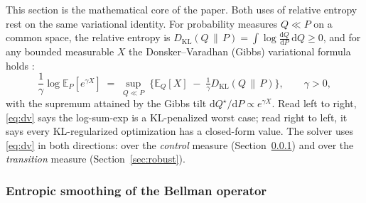 \documentclass[pdflatex,sn-mathphys-num]{sn-jnl}
\theoremstyle{thmstyleone}
\theoremstyle{thmstyletwo}
\theoremstyle{thmstylethree}
\newcommand{\dif}{\mathrm{d}}
\newcommand{\E}{\mathbb{E}}
\newcommand{\KL}[2]{D_{\mathrm{KL}}\!\left(#1 \,\middle\|\, #2\right)}
\begin{document}
This section is the mathematical core of the paper. Both uses of relative
entropy rest on the same variational identity. For probability measures
$Q \ll P$ on a common space, the relative entropy is
$\KL{Q}{P} = \int \log\frac{\dif Q}{\dif P}\,\dif Q \ge 0$, and for any
bounded measurable $X$ the Donsker--Varadhan (Gibbs) variational formula
holds \citep{dupuis1997}:
\begin{equation}
\frac1\gamma \log \E_P\!\left[e^{\gamma X}\right]
\;=\;
\sup_{Q \ll P}\;\Big\{ \E_Q[X] \;-\; \tfrac1\gamma \KL{Q}{P} \Big\},
\qquad \gamma > 0,
\label{eq:dv}
\end{equation}
with the supremum attained by the Gibbs tilt
$\dif Q^\star/\dif P \propto e^{\gamma X}$. Read left to right,
\eqref{eq:dv} says the log-sum-exp is a KL-penalized worst case; read
right to left, it says every KL-regularized optimization has a
closed-form value. The solver uses \eqref{eq:dv} in both directions: over
the \emph{control} measure (Section~\ref{sec:soft}) and over the
\emph{transition} measure (Section~\ref{sec:robust}).

\subsubsection{Entropic smoothing of the Bellman operator}
\label{sec:soft}
\end{document}
